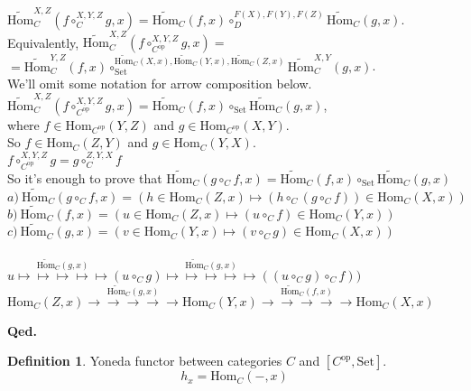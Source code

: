 \documentclass[10pt,a4paper]{article}
\theoremstyle{definition}
\newtheorem{definition}{Definition}[section]
\newcommand{\Hom}{{\mbox{Hom}}}
\newcommand{\HomMor}{{\widetilde{\Hom}\mbox{}}}
\newcommand{\op}{{\mbox{op}}}
\newcommand{\Set}{{\mbox{Set}}}
\newcommand{\myqed}{\noindent\textbf{Qed.}}
\begin{document}
\begin{enumerate}
$\HomMor_C^{X,Z}(f\circ_C^{X,Y,Z} g, x)=\HomMor_C(f,x)\circ_D^{F(X),F(Y),F(Z)} \HomMor_C(g,x)$.\\
Equivalently, $\HomMor_C^{X,Z}(f\circ_{C^\op}^{X,Y,Z} g, x)=$\\ $=\HomMor_C^{Y,Z}(f,x)\circ_\Set^{\HomMor_C(X,x),\HomMor_C(Y,x),\HomMor_C(Z,x)} \HomMor_C^{X,Y}(g,x)$.\\
We'll omit some notation for arrow composition below.\\
$\HomMor_C^{X,Z}(f\circ_{C^\op}^{X,Y,Z} g, x)=\HomMor_C(f,x)\circ_\Set \HomMor_C(g,x)$,\\
where $f\in\Hom_{C^\op}(Y,Z)$ and $g\in\Hom_{C^\op}(X,Y)$.\\
So $f\in\Hom_{C}(Z,Y)$ and $g\in\Hom_{C}(Y,X)$.\\
$f\circ_{C^\op}^{X,Y,Z} g = g\circ_{C}^{Z,Y,X} f$\\
So it's enough to prove that $\HomMor_C(g\circ_C f, x) = \HomMor_C(f, x) \circ_\Set \HomMor_C(g, x)$\\
$a)\ \HomMor_C(g\circ_C f, x) = (h \in\Hom_C(Z,x) \mapsto (h \circ_C (g\circ_C f))\in\Hom_C(X,x))$\\
$b)\ \HomMor_C(f, x) = \left(u \in\Hom_C(Z,x) \mapsto (u \circ_C f)\in\Hom_C(Y,x)\right)$\\
$c)\ \HomMor_C(g, x) = \left(v \in\Hom_C(Y,x) \mapsto (v \circ_C g)\in\Hom_C\left(X,x\right)\right)$\\
\\
$u \stackrel{\HomMor_C(g, x)}{\mapsto\mapsto\mapsto\mapsto\mapsto} (u \circ_C g)\stackrel{\HomMor_C(g, x)}{\mapsto\mapsto\mapsto\mapsto\mapsto} ((u \circ_C g) \circ_C f))$
\\
$\Hom_C(Z,x) \stackrel{\HomMor_C(g, x)}{\to\to\to\to\to} \Hom_C(Y,x)\stackrel{\HomMor_C(f, x)}{\to\to\to\to\to} \Hom_C(X,x)$
\\
\end{enumerate}
\myqed
\begin{definition}
Yoneda functor between categories $C$ and $[C^\op,\Set]$.
$$h_x = \Hom_C(-, x)$$
\end{definition}
\end{document}
